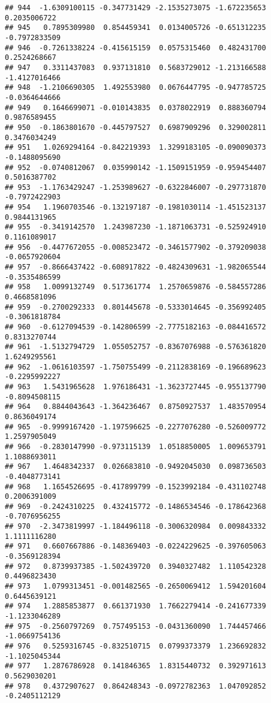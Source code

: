 \documentclass[
]{article}
\begin{document}
\begin{verbatim}
## 944  -1.6309100115 -0.347731429 -2.1535273075 -1.672235653  0.2035006722
## 945   0.7895309980  0.854459341  0.0134005726 -0.651312235 -0.7972833509
## 946  -0.7261338224 -0.415615159  0.0575315460  0.482431700  0.2524268667
## 947   0.3311437083  0.937131810  0.5683729012 -1.213166588 -1.4127016466
## 948  -1.2106690305  1.492553980  0.0676447795 -0.947785725 -0.0364644666
## 949   0.1646699071 -0.010143835  0.0378022919  0.888360794  0.9876589455
## 950  -0.1863801670 -0.445797527  0.6987909296  0.329002811  0.3476034249
## 951   1.0269294164 -0.842219393  1.3299183105 -0.090090373 -0.1488095690
## 952  -0.0740812067  0.035990142 -1.1509151959 -0.959454407  0.5016387702
## 953  -1.1763429247 -1.253989627 -0.6322846007 -0.297731870 -0.7972422903
## 954   1.1960703546 -0.132197187 -0.1981030114 -1.451523137  0.9844131965
## 955  -0.3419142570  1.243987230 -1.1871063731 -0.525924910  0.1161089017
## 956  -0.4477672055 -0.008523472 -0.3461577902 -0.379209038 -0.0657920604
## 957  -0.8666437422 -0.608917822 -0.4824309631 -1.982065544 -0.3535486599
## 958   1.0099132749  0.517361774  1.2570659876 -0.584557286  0.4668581096
## 959  -0.2700292333  0.801445678 -0.5333014645 -0.356992405 -0.3061818784
## 960  -0.6127094539 -0.142806599 -2.7775182163 -0.084416572  0.8313270744
## 961  -1.5132794729  1.055052757 -0.8367076988 -0.576361820  1.6249295561
## 962  -1.0616103597 -1.750755499 -0.2112838169 -0.196689623 -0.2295992227
## 963   1.5431965628  1.976186431 -1.3623727445 -0.955137790 -0.8094508115
## 964   0.8844043643 -1.364236467  0.8750927537  1.483570954  0.8636049174
## 965  -0.9999167420 -1.197596625 -0.2277076280 -0.526009772  1.2597905049
## 966  -0.2830147990 -0.973115139  1.0518850005  1.009653791  1.1088693011
## 967   1.4648342337  0.026683810 -0.9492045030  0.098736503 -0.4048773141
## 968   1.1654526695 -0.417899799 -0.1523992184 -0.431102748  0.2006391009
## 969  -0.2424310225  0.432415772 -0.1486534546 -0.178642368 -0.7076956255
## 970  -2.3473819997 -1.184496118 -0.3006320984  0.009843332  1.1111116280
## 971   0.6607667886 -0.148369403 -0.0224229625 -0.397605063 -0.3569128394
## 972   0.8739937385 -1.502439720  0.3940327482  1.110542328  0.4496823430
## 973   1.0799313451 -0.001482565 -0.2650069412  1.594201604  0.6445639121
## 974   1.2885853877  0.661371930  1.7662279414 -0.241677339 -1.1233046289
## 975  -0.2560797269  0.757495153 -0.0431360090  1.744457466 -1.0669754136
## 976   0.5259316745 -0.832510715  0.0799373379  1.236692832 -1.1025045344
## 977   1.2876786928  0.141846365  1.8315440732  0.392971613  0.5629030201
## 978   0.4372907627  0.864248343 -0.0972782363  1.047092852 -0.2405112129

\end{verbatim}
\end{document}
